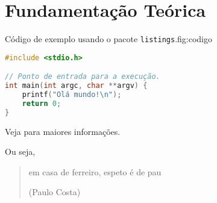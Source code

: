 \chapter{Fundamentação Teórica} \label{cap:fundamentacao}
\lipsum[3]

\begin{standardfigure}{Código de exemplo usando o pacote \texttt{listings}.}{fig:codigo}
    \begin{lstlisting}[language=c]
#include <stdio.h>

// Ponto de entrada para a execução.
int main(int argc, char **argv) {
    printf("Olá mundo!\n");
    return 0;
}
    \end{lstlisting}
\end{standardfigure}

\lipsum[4] Veja \textcite{einstein} para maiores informações. \blockquote[\cite{knuth:2021}]{\lipsum[5]}

\lipsum[6] Ou seja, \blockquote[(Paulo Costa)]{em casa de ferreiro, espeto é de pau}.